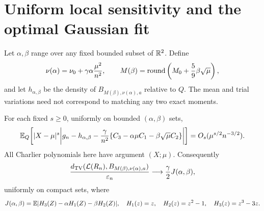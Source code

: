 \section{Uniform local sensitivity and the optimal Gaussian fit}\label{spb:ml:sec:local}
Let $\alpha,\beta$ range over any fixed bounded subset of $\mathbb R^2$. Define
\begin{equation}\label{spb:ml:eq:localfamily}
 \nu(\alpha)=\nu_0+\gamma\alpha\frac{\mu^2}{n^2},\qquad
 M(\beta)=\operatorname{round}\left(M_0+\frac59\beta\sqrt\mu\right),
\end{equation}
and let $h_{\alpha,\beta}$ be the density of $B_{M(\beta),\nu(\alpha),a}$ relative to $Q$. The mean and trial variations need not correspond to matching any two exact moments.

\begin{theorem}\label{spb:ml:thm:sensitivity}
For each fixed $s\ge0$, uniformly on bounded $(\alpha,\beta)$ sets,
\begin{equation}\label{spb:ml:eq:sensitivity}
\begin{split}
 \mathbb E_Q\bigg[|X-\mu|^s\bigg|g_n-h_{\alpha,\beta}
 -\frac{\gamma}{n^2}\{C_3-\alpha\mu C_1-\beta\sqrt\mu C_2\}\bigg|\bigg]
 =O_s(\mu^{s/2}n^{-3/2}).
\end{split}
\end{equation}
All Charlier polynomials here have argument $(X;\mu)$. Consequently
\begin{equation}\label{spb:ml:eq:localTV}
 \frac{d_{\mathrm{TV}}(\mathcal L(R_n),B_{M(\beta),\nu(\alpha),a})}{\varepsilon_n}
 \longrightarrow\frac\gamma2 J(\alpha,\beta),
\end{equation}
uniformly on compact sets, where
\begin{equation}\label{spb:ml:eq:J}
 J(\alpha,\beta)=\mathbb E|H_3(Z)-\alpha H_1(Z)-\beta H_2(Z)|,
 \quad H_1(z)=z,\quad H_2(z)=z^2-1,\quad H_3(z)=z^3-3z.
\end{equation}
\end{theorem}
